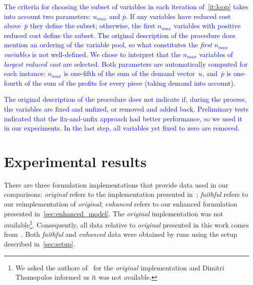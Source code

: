 \documentclass[smallextended]{svjour3}       %
\newif\iffinalversion
\newcommand{\newtext}[1]{\iffinalversion%
#1%
\else%
\textcolor{blue}{#1}%
\fi%
}
\begin{document}
\newtext{
The criteria for choosing the subset of variables in each iteration of~\autoref{it:loop} takes into account two parameters: \(n_{max}\) and \(\bar{p}\). If any variables have reduced cost above~\(\bar{p}\) they define the subset; otherwise, the first \(n_{max}\) variables with positive reduced cost define the subset. The original description of the procedure does mention an ordering of the variable pool, so what constitutes the \emph{first} \(n_{max}\) \emph{variables} is not well-defined. We chose to interpret that the \(n_{max}\) variables of \emph{largest reduced cost} are selected. Both parameters are automatically computed for each instance: \(n_{max}\) is one-fifth of the sum of the demand vector~\(u\), and~\(\bar{p}\) is one-fourth of the sum of the profits for every piece (taking demand into account).
}

\newtext{
The original description of the procedure does not indicate if, during the process, the variables are fixed and unfixed, or removed and added back.
Preliminary tests indicated that the fix-and-unfix approach had better performance, so we used it in our experiments.
In the last step, all variables yet fixed to zero are removed.
}

\section{Experimental results}
\label{sec:experimental_results}

There are three formulation implementations that provide data used in our comparisons:
\emph{original} refers to the implementation presented in~\cite{furini:2016,dimitri_thesis};
\emph{faithful} refers to our reimplementation of \emph{original};
\emph{enhanced} refers to our enhanced formulation presented in~\autoref{sec:enhanced_model}.
The \emph{original} implementation was not available\footnote{
	We asked the authors of~\cite{furini:2016} for the \emph{original} implementation and Dimitri Thomopulos informed us it was not available.
}.
Consequently, all data relative to \emph{original} presented in this work comes from~\cite{dimitri_thesis}.
Both \emph{faithful} and \emph{enhanced} data were obtained by runs using the setup described in~\autoref{sec:setup}.
\end{document}
